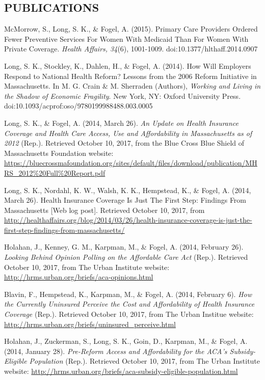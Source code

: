 \documentclass[margin, 10pt]{res} %
\begin{document}
\begin{resume}
\section{\small\bf PUBLICATIONS}
McMorrow, S., Long, S. K., \& Fogel, A. (2015). Primary Care Providers Ordered Fewer Preventive Services For Women With Medicaid Than For Women With Private Coverage. {\sl Health Affairs, 34}(6), 1001-1009. doi:10.1377/hlthaff.2014.0907

Long, S. K., Stockley, K., Dahlen, H., \& Fogel, A. (2014). How Will Employers Respond to National Health Reform? Lessons from the 2006 Reform Initiative in Massachusetts. In M. G. Crain \& M. Sherraden (Authors), {\sl Working and Living in the Shadow of Economic Fragility}. New York, NY: Oxford University Press. doi:10.1093/acprof:oso/9780199988488.003.0005

Long, S. K., \& Fogel, A. (2014, March 26). {\sl An Update on Health Insurance Coverage and Health Care Access, Use and Affordability in Massachusetts as of 2012} (Rep.). Retrieved October 10, 2017, from the Blue Cross Blue Shield of Massachusetts Foundation website: \url{https://bluecrossmafoundation.org/sites/default/files/download/publication/MHRS_2012%20Full%20Report.pdf}

Long, S. K., Nordahl, K. W., Walsh, K. K., Hempstead, K., \& Fogel, A. (2014, March 26). Health Insurance Coverage Is Just The First Step: Findings From Massachusetts [Web log post]. Retrieved October 10, 2017, from \url{http://healthaffairs.org/blog/2014/03/26/health-insurance-coverage-is-just-the-first-step-findings-from-massachusetts/}

Holahan, J., Kenney, G. M., Karpman, M., \& Fogel, A. (2014, February 26). {\sl Looking Behind Opinion Polling on the Affordable Care Act} (Rep.). Retrieved October 10, 2017, from The Urban Institute website: \url{http://hrms.urban.org/briefs/aca-opinions.html}

Blavin, F., Hempstead, K., Karpman, M., \& Fogel, A. (2014, February 6). {\sl How the Currently Uninsured Perceive the Cost and Affordability of Health Insurance Coverage} (Rep.). Retrieved October 10, 2017, from The Urban Institue website: \url{http://hrms.urban.org/briefs/uninsured_perceive.html}

Holahan, J., Zuckerman, S., Long, S. K., Goin, D., Karpman, M., \& Fogel, A. (2014, January 28). {\sl Pre-Reform Access and Affordability for the ACA's Subsidy-Eligible Population} (Rep.). Retrieved October 10, 2017, from The Urban Institute website: \url{http://hrms.urban.org/briefs/aca-subsidy-eligible-population.html}


\end{resume}
\end{document}
